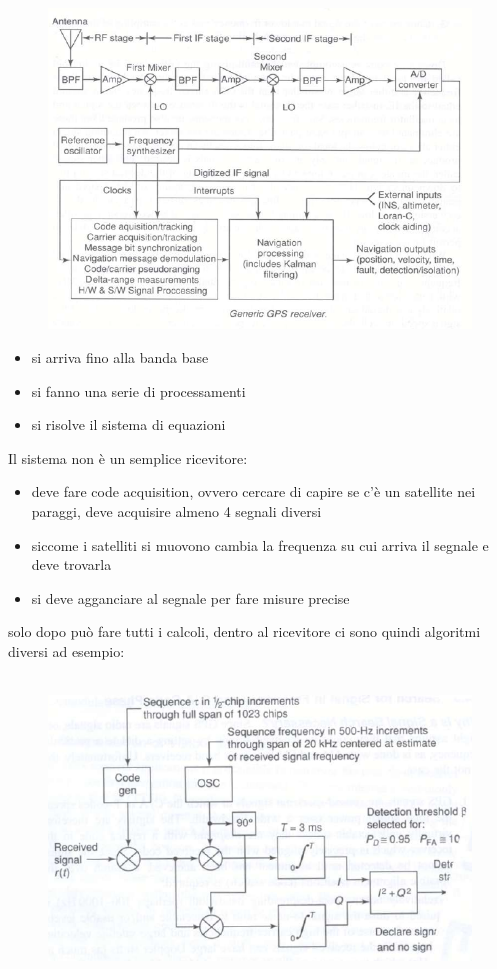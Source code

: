 \documentclass[oneside, 12pt]{extbook}
\begin{document}
\begin{figure}[!h]
	\includegraphics[scale=0.4]{immagini/localization/gps_antenna.png}
\end{figure}
\begin{itemize}
	\item si arriva fino alla banda base
	\item si fanno una serie di processamenti 
	\item si risolve il sistema di equazioni
\end{itemize}
Il sistema non è un semplice ricevitore:
\begin{itemize}
	\item deve fare code acquisition, ovvero cercare di capire se c'è un satellite nei paraggi, deve acquisire almeno 4 segnali diversi
	\item siccome i satelliti si muovono cambia la frequenza su cui arriva il segnale e deve trovarla
	\item si deve agganciare al segnale per fare misure precise
\end{itemize}
solo dopo può fare tutti i calcoli, dentro al ricevitore ci sono quindi algoritmi diversi ad esempio:\\\\
\begin{figure}[!h]
	\includegraphics[scale=0.4]{immagini/localization/gps_alg.png}
\end{figure}\\
\end{document}
